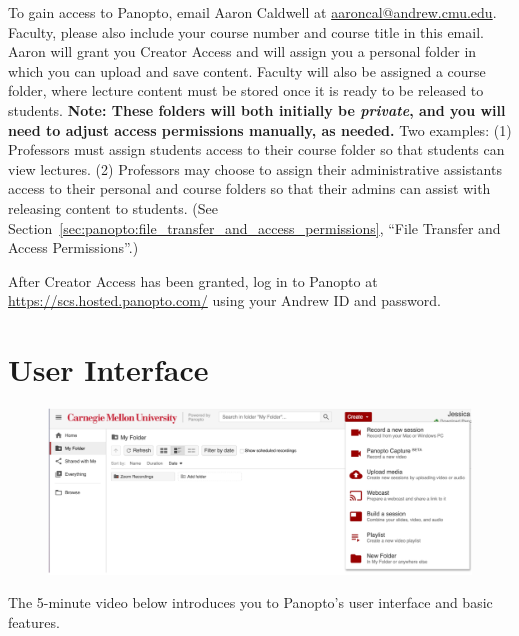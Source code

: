 To gain access to Panopto, email Aaron Caldwell at \href{mailto:aaroncal@andrew.cmu.edu?subject=Creator Access}{aaroncal@andrew.cmu.edu}. Faculty, please also include your course number and course title in this email. Aaron will grant you Creator Access and will assign you a personal folder in which you can upload and save content. Faculty will also be assigned a course folder, where lecture content must be stored once it is ready to be released to students. \textbf{Note: These folders will both initially be \emph{private}, and you will need to adjust access permissions manually, as needed.} Two examples: (1) Professors must assign students access to their course folder so that students can view lectures. (2) Professors may choose to assign their administrative assistants access to their personal and course folders so that their admins can assist with releasing content to students. (See Section~\ref{sec:panopto:file_transfer_and_access_permissions}, ``File Transfer and Access Permissions''.)

After Creator Access has been granted, log in to Panopto at \href{https://scs.hosted.panopto.com/}{https://scs.hosted.panopto.com/} using your Andrew ID and password.


\section{User Interface}
\label{sec:panopto:user_interface}

\begin{gram}
	\begin{figure}[H]
		\centering
		\includegraphics[scale=0.5]{panopto/01-ui.png}
	\end{figure}

	The 5-minute video below introduces you to Panopto’s user interface and basic features.

\end{gram}



